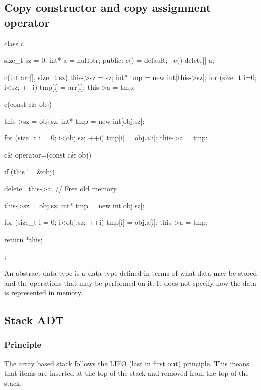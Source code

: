 \documentclass{report}
\begin{document}
     \subsection{Copy constructor and copy assignment operator}
     \bigbreak \noindent 
     \begin{cppcode}
         class c {
             size_t sz = 0;
             int* a = nullptr;
             public:
             c() = default;
             ~c() {
                 delete[] a;
             }

             c(int arr[], size_t sz) {
                 this->sz = sz;
                 int* tmp = new int[this->sz];
                 for (size_t i=0; i<sz; ++i) {
                     tmp[i] = arr[i];
                 }
                 this->a = tmp;
             }

             c(const c& obj) {
                 this->sz = obj.sz;
                 int* tmp = new int[obj.sz];

                 for (size_t i = 0; i<obj.sz; ++i) {
                     tmp[i] = obj.a[i];
                 }
                 this->a = tmp;
             }

             c& operator=(const c& obj) {
                 if (this != &obj) {
                     delete[] this->a; // Free old memory

                     this->sz = obj.sz;
                     int* tmp = new int[obj.sz];

                     for (size_t i = 0; i<obj.sz; ++i) {
                         tmp[i] = obj.a[i];
                     }
                     this->a = tmp;
                 }
                 return *this;
             }
         };
     \end{cppcode}

     \pagebreak 
     \bigbreak \noindent 
     An abstract data type is a data type defined in terms of what data may be stored and the
     operations that may be performed on it. It does not specify how the data is represented in
     memory.

     \pagebreak 
     \bigbreak \noindent 
     \subsection{Stack ADT}
     \bigbreak \noindent 
     \subsubsection{Principle}
     \bigbreak \noindent 
     The array based stack follows the LIFO (last in first out) principle. This means that items are inserted at the top of the stack and removed from the top of the stack.
     \bigbreak \noindent 
\end{document}
